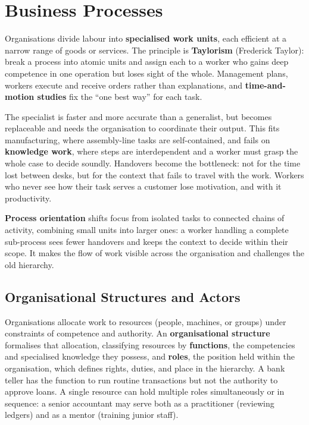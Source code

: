 \section{Business Processes}
Organisations divide labour into \textbf{specialised work units}, each efficient at a narrow range of goods or services. The principle is \textbf{Taylorism} (Frederick Taylor): break a process into atomic units and assign each to a worker who gains deep competence in one operation but loses sight of the whole. Management plans, workers execute and receive orders rather than explanations, and \textbf{time-and-motion studies} fix the ``one best way'' for each task.

The specialist is faster and more accurate than a generalist, but becomes replaceable and needs the organisation to coordinate their output. This fits manufacturing, where assembly-line tasks are self-contained, and fails on \textbf{knowledge work}, where steps are interdependent and a worker must grasp the whole case to decide soundly. Handovers become the bottleneck: not for the time lost between desks, but for the context that fails to travel with the work. Workers who never see how their task serves a customer lose motivation, and with it productivity.

\textbf{Process orientation} shifts focus from isolated tasks to connected chains of activity, combining small units into larger ones: a worker handling a complete sub-process sees fewer handovers and keeps the context to decide within their scope. It makes the flow of work visible across the organisation and challenges the old hierarchy.

\subsection{Organisational Structures and Actors}

Organisations allocate work to resources (people, machines, or groups) under constraints of competence and authority. An \textbf{organisational structure} formalises that allocation, classifying resources by \textbf{functions}, the competencies and specialised knowledge they possess, and \textbf{roles}, the position held within the organisation, which defines rights, duties, and place in the hierarchy. A bank teller has the function to run routine transactions but not the authority to approve loans. A single resource can hold multiple roles simultaneously or in sequence: a senior accountant may serve both as a practitioner (reviewing ledgers) and as a mentor (training junior staff).

